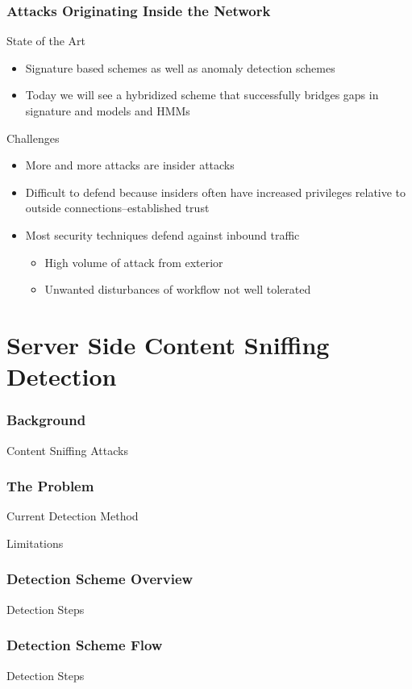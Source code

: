 \documentclass[10pt,mathserif]{beamer}
\begin{document}
\begin{frame}
  \frametitle{Attacks Originating Inside the Network}
  \begin{block}{State of the Art}
    \begin{itemize}
    \item Signature based schemes as well as anomaly detection schemes
    \item Today we will see a hybridized scheme that successfully
      bridges gaps in signature and models and HMMs
    \end{itemize}
  \end{block}

  \begin{block}{Challenges}
    \begin{itemize}
    \item More and more attacks are insider attacks
    \item Difficult to defend because insiders often have increased
      privileges relative to outside connections--established trust
    \item Most security techniques defend against inbound traffic
      \begin{itemize}
      \item High volume of attack from exterior
      \item Unwanted disturbances of workflow not well tolerated
      \end{itemize}
    \end{itemize}
  \end{block}
\end{frame}

\section{Server Side Content Sniffing Detection}

\begin{frame}
  \frametitle{Background}
  \begin{block}{Content Sniffing Attacks}
  \end{block}
\end{frame}
\begin{frame}
  \frametitle{The Problem}
  \begin{block}{Current Detection Method}
  \end{block}
  \begin{block}{Limitations}
  \end{block}
\end{frame}
\begin{frame}
  \frametitle{Detection Scheme Overview}
  \begin{block}{Detection Steps}
  \end{block}
\end{frame}
\begin{frame}
  \frametitle{Detection Scheme Flow}
  \begin{block}{Detection Steps}
  \end{block}
\end{frame}
\end{document}
